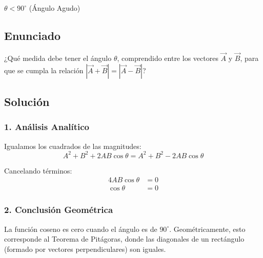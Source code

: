 \documentclass[12pt, a4paper]{article}
\begin{document}
\begin{tcolorbox}[colback=green!5!white, colframe=green!50!black, title=Respuesta Final]
\centering \Large $\theta < 90^\circ$ (Ángulo Agudo)
\end{tcolorbox}

\newpage

\subsection*{Enunciado}
¿Qué medida debe tener el ángulo $\theta$, comprendido entre los vectores $\vec{A}$ y $\vec{B}$, para que se cumpla la relación $|\vec{A} + \vec{B}| = |\vec{A} - \vec{B}|$?

\begin{center}
\end{center}

\subsection*{Solución}

\subsubsection*{1. Análisis Analítico}
Igualamos los cuadrados de las magnitudes:
\begin{equation*}
    A^2 + B^2 + 2AB\cos\theta = A^2 + B^2 - 2AB\cos\theta
\end{equation*}

Cancelando términos:
\begin{align*}
    4AB\cos\theta &= 0 \\
    \cos\theta &= 0
\end{align*}

\subsubsection*{2. Conclusión Geométrica}
La función coseno es cero cuando el ángulo es de $90^\circ$. Geométricamente, esto corresponde al Teorema de Pitágoras, donde las diagonales de un rectángulo (formado por vectores perpendiculares) son iguales.
\end{document}
